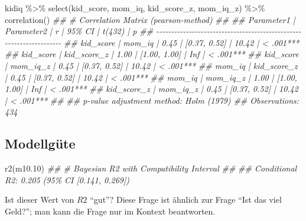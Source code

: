 \documentclass[
  a4paper,
  DIV=11]{scrreprt}
\newenvironment{Shaded}{\begin{snugshade}}{\end{snugshade}}
\newcommand{\DocumentationTok}[1]{\textcolor[rgb]{0.37,0.37,0.37}{\textit{#1}}}
\newcommand{\FloatTok}[1]{\textcolor[rgb]{0.68,0.00,0.00}{#1}}
\newcommand{\FunctionTok}[1]{\textcolor[rgb]{0.28,0.35,0.67}{#1}}
\newcommand{\NormalTok}[1]{\textcolor[rgb]{0.00,0.23,0.31}{#1}}
\newcommand{\SpecialCharTok}[1]{\textcolor[rgb]{0.37,0.37,0.37}{#1}}
\theoremstyle{definition}
\theoremstyle{remark}
\begin{document}
\begin{Shaded}
\begin{Highlighting}[]
\NormalTok{kidiq }\SpecialCharTok{\%\textgreater{}\%} 
  \FunctionTok{select}\NormalTok{(kid\_score, mom\_iq, kid\_score\_z, mom\_iq\_z) }\SpecialCharTok{\%\textgreater{}\%} 
  \FunctionTok{correlation}\NormalTok{()}
\DocumentationTok{\#\# \# Correlation Matrix (pearson{-}method)}
\DocumentationTok{\#\# }
\DocumentationTok{\#\# Parameter1  |  Parameter2 |    r |       95\% CI | t(432) |         p}
\DocumentationTok{\#\# {-}{-}{-}{-}{-}{-}{-}{-}{-}{-}{-}{-}{-}{-}{-}{-}{-}{-}{-}{-}{-}{-}{-}{-}{-}{-}{-}{-}{-}{-}{-}{-}{-}{-}{-}{-}{-}{-}{-}{-}{-}{-}{-}{-}{-}{-}{-}{-}{-}{-}{-}{-}{-}{-}{-}{-}{-}{-}{-}{-}{-}{-}{-}{-}{-}{-}{-}{-}}
\DocumentationTok{\#\# kid\_score   |      mom\_iq | 0.45 | [0.37, 0.52] |  10.42 | \textless{} .001***}
\DocumentationTok{\#\# kid\_score   | kid\_score\_z | 1.00 | [1.00, 1.00] |    Inf | \textless{} .001***}
\DocumentationTok{\#\# kid\_score   |    mom\_iq\_z | 0.45 | [0.37, 0.52] |  10.42 | \textless{} .001***}
\DocumentationTok{\#\# mom\_iq      | kid\_score\_z | 0.45 | [0.37, 0.52] |  10.42 | \textless{} .001***}
\DocumentationTok{\#\# mom\_iq      |    mom\_iq\_z | 1.00 | [1.00, 1.00] |    Inf | \textless{} .001***}
\DocumentationTok{\#\# kid\_score\_z |    mom\_iq\_z | 0.45 | [0.37, 0.52] |  10.42 | \textless{} .001***}
\DocumentationTok{\#\# }
\DocumentationTok{\#\# p{-}value adjustment method: Holm (1979)}
\DocumentationTok{\#\# Observations: 434}
\end{Highlighting}
\end{Shaded}

\hypertarget{modellguxfcte}{%
\subsection{Modellgüte}\label{modellguxfcte}}

\begin{Shaded}
\begin{Highlighting}[]
\FunctionTok{r2}\NormalTok{(m10}\FloatTok{.10}\NormalTok{)}
\DocumentationTok{\#\# \# Bayesian R2 with Compatibility Interval}
\DocumentationTok{\#\# }
\DocumentationTok{\#\#   Conditional R2: 0.205 (95\% CI [0.141, 0.269])}
\end{Highlighting}
\end{Shaded}

Ist dieser Wert von \(R2\) ``gut''? Diese Frage ist ähnlich zur Frage
``Ist das viel Geld?''; man kann die Frage nur im Kontext beantworten.
\end{document}
